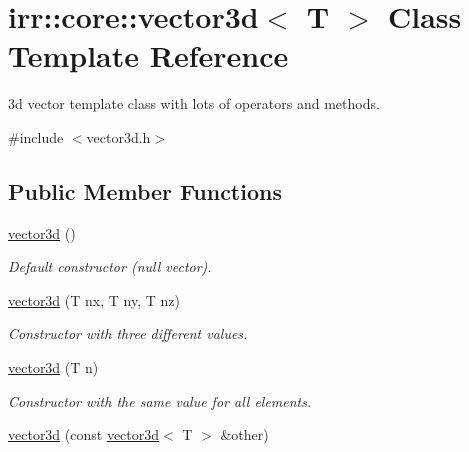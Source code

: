 \hypertarget{classirr_1_1core_1_1vector3d}{}\section{irr\+:\+:core\+:\+:vector3d$<$ T $>$ Class Template Reference}
\label{classirr_1_1core_1_1vector3d}


3d vector template class with lots of operators and methods.  




{\ttfamily \#include $<$vector3d.\+h$>$}

\subsection*{Public Member Functions}
\begin{DoxyCompactItemize}
\item 
\hyperlink{classirr_1_1core_1_1vector3d_aed8875ec8b9653857ea87fdb8213daf1}{vector3d} ()\hypertarget{classirr_1_1core_1_1vector3d_aed8875ec8b9653857ea87fdb8213daf1}{}\label{classirr_1_1core_1_1vector3d_aed8875ec8b9653857ea87fdb8213daf1}

\begin{DoxyCompactList}\small\item\em Default constructor (null vector). \end{DoxyCompactList}\item 
\hyperlink{classirr_1_1core_1_1vector3d_a10687f6e33f8f795961a9b8f0a71c79b}{vector3d} (T nx, T ny, T nz)\hypertarget{classirr_1_1core_1_1vector3d_a10687f6e33f8f795961a9b8f0a71c79b}{}\label{classirr_1_1core_1_1vector3d_a10687f6e33f8f795961a9b8f0a71c79b}

\begin{DoxyCompactList}\small\item\em Constructor with three different values. \end{DoxyCompactList}\item 
\hyperlink{classirr_1_1core_1_1vector3d_a08093c70044d66a5c3cdec2522b868f2}{vector3d} (T n)\hypertarget{classirr_1_1core_1_1vector3d_a08093c70044d66a5c3cdec2522b868f2}{}\label{classirr_1_1core_1_1vector3d_a08093c70044d66a5c3cdec2522b868f2}

\begin{DoxyCompactList}\small\item\em Constructor with the same value for all elements. \end{DoxyCompactList}\item 
\hyperlink{classirr_1_1core_1_1vector3d_a039600f48ce75c9eca6c0899135e60d5}{vector3d} (const \hyperlink{classirr_1_1core_1_1vector3d}{vector3d}$<$ T $>$ \&other)\hypertarget{classirr_1_1core_1_1vector3d_a039600f48ce75c9eca6c0899135e60d5}{}\label{classirr_1_1core_1_1vector3d_a039600f48ce75c9eca6c0899135e60d5}


\end{DoxyCompactItemize}
